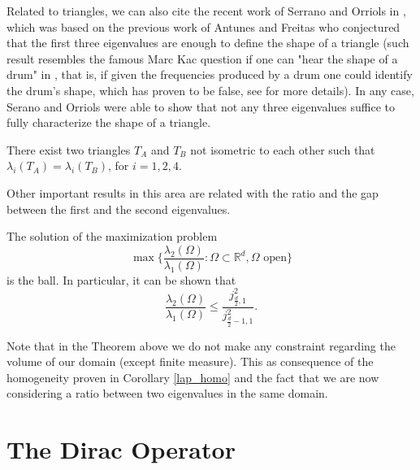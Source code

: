 Related to triangles, we can also cite the recent work of Serrano and Orriols in \cite{gomez2021any}, which was based on the previous work of Antunes and Freitas \cite{antunes2011inverse} who conjectured that the first three eigenvalues are enough to define the shape of a triangle (such result resembles the famous Marc Kac question if one can "hear the shape of a drum" in \cite{kac1966can}, that is, if given the frequencies produced by a drum one could identify the drum's shape, which has proven to be false, see \cite{gordon1992isospectral} for more details). In any case, Serano and Orriols were able to show that not any three eigenvalues suffice to fully characterize the shape of a triangle.
\begin{theorem}
    There exist two triangles \(T_A\) and \(T_B\) not isometric to each other such that \(\lambda_i(T_A) = \lambda_i(T_B)\), for \(i=1, 2, 4\).    
\end{theorem}

Other important results in this area are related with the ratio and the gap between the first and the second eigenvalues.
\begin{theorem}\label{ashbaugh-benguria theorem}
    The solution of the maximization problem
    \[
    \max \Big\{\frac{\lambda_2(\Omega)}{\lambda_1(\Omega)}: \Omega \subset \mathbb{R}^d, \Omega \text{ open} \Big\}
    \]
    is the ball. In particular, it can be shown that
    \[
    \frac{\lambda_2(\Omega)}{\lambda_1(\Omega)}  \leq \frac{j_{\frac{d}{2},1}^2}{j_{\frac{d}{2}-1,1}^2}.
    \]
\end{theorem}

\begin{remark}
    Note that in the Theorem above we do not make any constraint regarding the volume of our domain (except finite measure). This as consequence of the homogeneity proven in Corollary \eqref{lap_homo} and the fact that we are now considering a ratio between two eigenvalues in the same domain.
\end{remark}


\section{The Dirac Operator}
 
